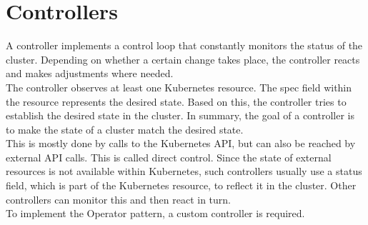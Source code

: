 \section{Controllers}\label{sec:controllers}
A controller implements a control loop that constantly monitors the status of the cluster.
Depending on whether a certain change takes place, the controller reacts and makes adjustments where needed.
\\
The controller observes at least one Kubernetes resource.
The spec field within the resource represents the desired state.
Based on this, the controller tries to establish the desired state in the cluster.
In summary, the goal of a controller is to make the state of a cluster match the desired state.
\\
This is mostly done by calls to the Kubernetes API, but can also be reached by external API calls.
This is called direct control.
Since the state of external resources is not available within Kubernetes, such controllers usually use a status field, which is part of the Kubernetes resource, to reflect it in the cluster.
Other controllers can monitor this and then react in turn.
\\
To implement the Operator pattern, a custom controller is required.
~\cite{KUBERNETES-CONTROLLERS}